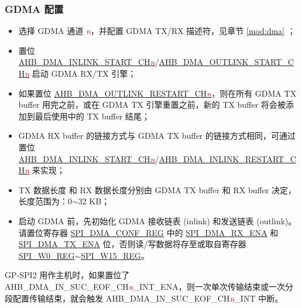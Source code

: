 \documentclass[main\_\_CN.tex]{subfiles}
\begin{document}
\subsubsection{GDMA 配置}

\begin{itemize}
    \item 选择 GDMA 通道 \textcolor{red}{\it{n}}，并配置 GDMA TX/RX 描述符，见章节 \ref{mod:dma} \textit{}；
    
    \item 置位 \hyperref[fielddesc:AHBDMAINLINKSTARTCHN]{AHB\_DMA\_INLINK\_START\_CH\textcolor{red}{\it{n}}}/\hyperref[fielddesc:AHBDMAOUTLINKSTARTCHN]{AHB\_DMA\_OUTLINK\_START\_CH\textcolor{red}{\it{n}}} 启动 GDMA RX/TX 引擎；

    \item 如果置位 \hyperref[fielddesc:AHBDMAOUTLINKRESTARTCHN]{AHB\_DMA\_OUTLINK\_RESTART\_CH\textcolor{red}{\it{n}}}，则在所有 GDMA TX buffer 用完之前，或在 GDMA TX 引擎重置之前，新的 TX buffer 将会被添加到最后使用中的 TX buffer 结尾；
  
    \item GDMA RX buffer 的链接方式与 GDMA TX buffer 的链接方式相同，可通过置位 \hyperref[fielddesc:AHBDMAINLINKSTARTCHN]{AHB\_DMA\_INLINK\_START\_CH\textcolor{red}{\it{n}}}/\hyperref[fielddesc:AHBDMAINLINKRESTARTCHN]{AHB\_DMA\_INLINK\_RESTART\_CH\textcolor{red}{\it{n}}} 来实现；
  
    \item TX 数据长度 和 RX 数据长度分别由 GDMA TX buffer 和 RX buffer 决定，长度范围为：0$\sim$32 KB； 
  
    \item 启动 GDMA 前，先初始化 GDMA 接收链表 (inlink) 和发送链表 (outlink)。请置位寄存器 \hyperref[regdesc:SPIDMACONFREG]{SPI\_DMA\_CONF\_REG} 中的 \hyperref[fielddesc:SPIDMARXENA]{SPI\_DMA\_RX\_ENA} 和 \hyperref[fielddesc:SPIDMATXENA]{SPI\_DMA\_TX\_ENA} 位，否则读/写数据将存至或取自寄存器 \hyperref[regdesc:SPIW0REG]{SPI\_W0\_REG}$\sim$\hyperref[regdesc:SPIW15REG]{SPI\_W15\_REG}。
  
\end{itemize}

GP-SPI2 用作主机时，如果置位了 AHB\_DMA\_IN\_SUC\_EOF\_CH\textcolor{red}{\it{n}}\_INT\_ENA，则一次单次传输结束或一次分段配置传输结束，就会触发 AHB\_DMA\_IN\_SUC\_EOF\_CH\textcolor{red}{\it{n}}\_INT 中断。
\end{document}
